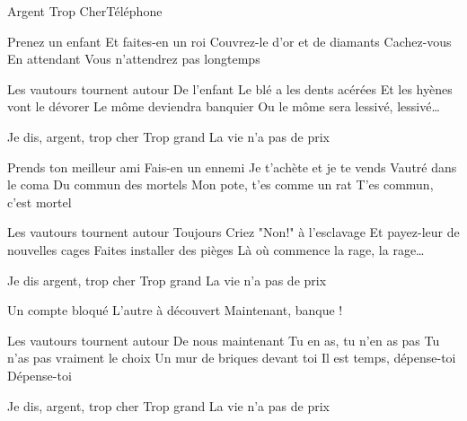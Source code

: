 \begin{Song}{Argent Trop Cher}{Téléphone}
\begin{multicols}{2}
\begin{Verse}
Prenez un enfant
Et faites-en un roi
Couvrez-le d'or et de diamants
Cachez-vous
En attendant
Vous n'attendrez pas longtemps
\end{Verse}
\espaceInterStrophe

\begin{PreChorus}
Les vautours tournent autour
De l'enfant
Le blé a les dents acérées
Et les hyènes vont le dévorer
Le môme deviendra banquier
Ou le môme sera lessivé, lessivé\dots
\end{PreChorus}
\espaceInterStrophe

\begin{Chorus}
Je dis, argent, trop cher
Trop grand
La vie n'a pas de prix
\end{Chorus}
\espaceInterStrophe

\begin{Verse}
Prends ton meilleur ami
Fais-en un ennemi
Je t'achète et je te vends
Vautré dans le coma
Du commun des mortels
Mon pote, t'es comme un rat
T'es commun, c'est mortel
\end{Verse}
\espaceInterStrophe

\begin{PreChorus}
Les vautours tournent autour
Toujours
Criez "Non!"  à l'esclavage
Et payez-leur de nouvelles cages
Faites installer des pièges
Là où commence la rage, la rage\dots
\end{PreChorus}
\espaceInterStrophe

\begin{Chorus}
Je dis argent, trop cher
Trop grand
La vie n'a pas de prix
\end{Chorus}
\espaceInterStrophe

\begin{Verse}
Un compte bloqué
L'autre à découvert
Maintenant, banque !
\end{Verse}
\espaceInterStrophe

\begin{PreChorus}
Les vautours tournent autour
De nous maintenant
Tu en as, tu n'en as pas
Tu n'as pas vraiment le choix
Un mur de briques devant toi
Il est temps, dépense-toi
Dépense-toi
\end{PreChorus}
\espaceInterStrophe

\begin{Chorus}
Je dis, argent, trop cher
Trop grand
La vie n'a pas de prix
\end{Chorus}


\end{multicols}
\end{Song}

